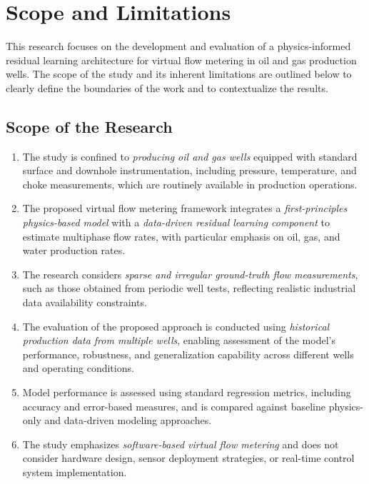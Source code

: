 \documentclass[12pt,APA]{uomthesis}
\begin{document}
\section{Scope and Limitations}
This research focuses on the development and evaluation of a physics-informed residual learning architecture for virtual flow metering in oil and gas production wells. The scope of the study and its inherent limitations are outlined below to clearly define the boundaries of the work and to contextualize the results.

\subsection{Scope of the Research}
\begin{enumerate}
    \item The study is confined to \textit{producing oil and gas wells} equipped with standard surface and downhole instrumentation, including pressure, temperature, and choke measurements, which are routinely available in production operations.

    \item The proposed virtual flow metering framework integrates a \textit{first-principles physics-based model} with a \textit{data-driven residual learning component} to estimate multiphase flow rates, with particular emphasis on oil, gas, and water production rates.

    \item The research considers \textit{sparse and irregular ground-truth flow measurements}, such as those obtained from periodic well tests, reflecting realistic industrial data availability constraints.

    \item The evaluation of the proposed approach is conducted using \textit{historical production data from multiple wells}, enabling assessment of the model's performance, robustness, and generalization capability across different wells and operating conditions.

    \item Model performance is assessed using standard regression metrics, including accuracy and error-based measures, and is compared against baseline physics-only and data-driven modeling approaches.

    \item The study emphasizes \textit{software-based virtual flow metering} and does not consider hardware design, sensor deployment strategies, or real-time control system implementation.

\end{enumerate}
\end{document}
